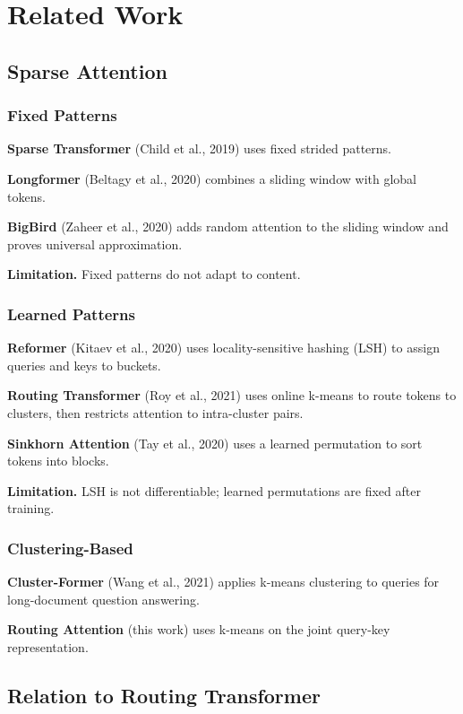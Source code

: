 
\section{Related Work}

\subsection{Sparse Attention}

\subsubsection{Fixed Patterns}

\textbf{Sparse Transformer} (Child et al., 2019) uses fixed strided patterns.

\textbf{Longformer} (Beltagy et al., 2020) combines a sliding window with global 
tokens.

\textbf{BigBird} (Zaheer et al., 2020) adds random attention to the sliding 
window and proves universal approximation.

\textbf{Limitation.} Fixed patterns do not adapt to content.

\subsubsection{Learned Patterns}

\textbf{Reformer} (Kitaev et al., 2020) uses locality-sensitive hashing (LSH) to 
assign queries and keys to buckets.

\textbf{Routing Transformer} (Roy et al., 2021) uses online k-means to route 
tokens to clusters, then restricts attention to intra-cluster pairs.

\textbf{Sinkhorn Attention} (Tay et al., 2020) uses a learned permutation to sort 
tokens into blocks.

\textbf{Limitation.} LSH is not differentiable; learned permutations are fixed 
after training.

\subsubsection{Clustering-Based}

\textbf{Cluster-Former} (Wang et al., 2021) applies k-means clustering to queries 
for long-document question answering.

\textbf{Routing Attention} (this work) uses k-means on the joint query-key 
representation.

\subsection{Relation to Routing Transformer}

